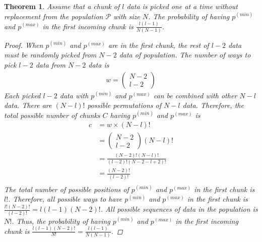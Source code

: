 \documentclass[a4paper,fleqn]{cas-dc}
\begin{document}
\newtheorem{theorem}{Theorem}
\begin{theorem}
Assume that a chunk of $l$ data is picked one at a time without replacement from the population $\mathcal{P}$ with size $N$. 
The probability of having $p^{(min)}$ and $p^{(max)}$ in the first incoming chunk is 
$\frac{l(l-1)}{N(N-1)}$.

\begin{proof}
When $p^{(min)}$ and $p^{(max)}$ are in the first chunk, the rest of $l-2$ data must be randomly picked 
from $N-2$ data of population. The number of ways to pick $l-2$ data from $N-2$ data is
\begin{align*}
w = \left ( \begin{array}{c}
N-2 \\
l-2
\end{array}
\right )
\end{align*}
Each picked $l-2$ data with $p^{(min)}$ and $p^{(max)}$ can be combined with other $N-l$ data. There are
$(N-l)!$ possible permutations of $N-l$ data. Therefore, the total possible number of chunks $C$ having 
$p^{(min)}$ and $p^{(max)}$ is
\begin{align*}
c & = w \times (N-l)!  \\
  & = \left ( \begin{array}{c}
                 N-2 \\
                 l-2
                \end{array} 
                \right ) (N-l)!\\
  & = \frac{(N-2)!(N-l)!}{(l-2)!(N-2-l+2)!} \\
  & = \frac{(N-2)!}{(l-2)!} \\
\end{align*}
The total number of possible positions of $p^{(min)}$ and $p^{(max)}$ in the first chunk is $l!$. 
Therefore, all possible ways to have $p^{(min)}$ and $p^{(max)}$ in the first chunk is 
$\frac{l!(N-2)!}{(l-2)!} = l(l-1)(N-2)!$.
All possible sequences of data in the population is $N!$. Thus, the probability of having $p^{(min)}$ 
and $p^{(max)}$ in the first incoming chunk is $\frac{l(l-1)(N-2)!}{N!} = \frac{l(l-1)}{N(N-1)}$.  
\end{proof}
\end{theorem}
\end{document}
